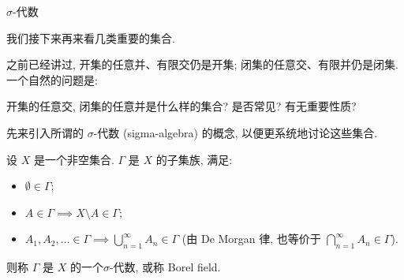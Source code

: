 \begin{frame}{$\sigma$-代数}

我们接下来再来看几类重要的集合.

\vspace{0.5em}

之前已经讲过, 开集的任意并、有限交仍是开集; 闭集的任意交、有限并仍是闭集. 一个自然的问题是:

\begin{question}
开集的任意交, 闭集的任意并是什么样的集合? 是否常见? 有无重要性质?
\end{question}

\pause
\vspace{0.5em}

先来引入所谓的 $\sigma$-代数 (sigma-algebra) 的概念, 以便更系统地讨论这些集合.

\begin{Def}[$\sigma$-代数]
设 $X$ 是一个非空集合. $\Gamma$ 是 $X$ 的子集族, 满足:
\begin{itemize}
\item $\emptyset \in \Gamma;$
\item $A \in \Gamma \implies X \setminus A \in \Gamma;$
\item $A_1, A_2, \ldots \in \Gamma \implies \bigcup_{n=1}^\infty A_n \in \Gamma$ (由 De Morgan 律, 也等价于 $\bigcap_{n=1}^\infty A_n \in \Gamma$).
\end{itemize}
则称 $\Gamma$ 是 $X$ 的一个\alert{$\sigma$-代数}, 或称 Borel field.
\end{Def}

\end{frame}


